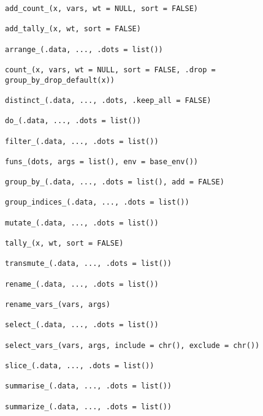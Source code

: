 \documentclass[a4paper]{book}
\begin{document}
\begin{Usage}
\begin{verbatim}
add_count_(x, vars, wt = NULL, sort = FALSE)

add_tally_(x, wt, sort = FALSE)

arrange_(.data, ..., .dots = list())

count_(x, vars, wt = NULL, sort = FALSE, .drop = group_by_drop_default(x))

distinct_(.data, ..., .dots, .keep_all = FALSE)

do_(.data, ..., .dots = list())

filter_(.data, ..., .dots = list())

funs_(dots, args = list(), env = base_env())

group_by_(.data, ..., .dots = list(), add = FALSE)

group_indices_(.data, ..., .dots = list())

mutate_(.data, ..., .dots = list())

tally_(x, wt, sort = FALSE)

transmute_(.data, ..., .dots = list())

rename_(.data, ..., .dots = list())

rename_vars_(vars, args)

select_(.data, ..., .dots = list())

select_vars_(vars, args, include = chr(), exclude = chr())

slice_(.data, ..., .dots = list())

summarise_(.data, ..., .dots = list())

summarize_(.data, ..., .dots = list())
\end{verbatim}
\end{Usage}
%
\end{document}
